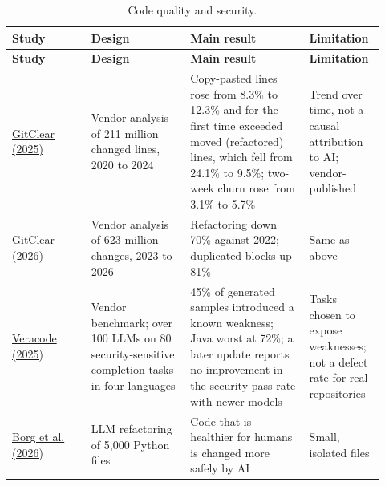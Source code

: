 \documentclass[11pt]{article}
\begin{document}
\small
\begin{longtable}{p{0.2\linewidth}p{0.25\linewidth}p{0.3\linewidth}p{0.17\linewidth}}
\caption{Code quality and security.}\\
\toprule
\textbf{Study} & \textbf{Design} & \textbf{Main result} & \textbf{Limitation} \\
\midrule
\endfirsthead
\toprule
\textbf{Study} & \textbf{Design} & \textbf{Main result} & \textbf{Limitation} \\
\midrule
\endhead
\href{https://www.devclass.com/ai-ml/2025/02/20/ai-is-eroding-code-quality-states-new-in-depth-report/1626250}{GitClear (2025)} & Vendor analysis of 211 million changed lines, 2020 to 2024 & Copy-pasted lines rose from 8.3\% to 12.3\% and for the first time exceeded moved (refactored) lines, which fell from 24.1\% to 9.5\%; two-week churn rose from 3.1\% to 5.7\% & Trend over time, not a causal attribution to AI; vendor-published \\
\href{https://www.gitclear.com/recent_ai_developer_productivity_code_quality_research}{GitClear (2026)} & Vendor analysis of 623 million changes, 2023 to 2026 & Refactoring down 70\% against 2022; duplicated blocks up 81\% & Same as above \\
\href{https://www.businesswire.com/news/home/20250730694951/en/AI-Generated-Code-Poses-Major-Security-Risks-in-Nearly-Half-of-All-Development-Tasks-Veracode-Research-Reveals}{Veracode (2025)} & Vendor benchmark; over 100 LLMs on 80 security-sensitive completion tasks in four languages & 45\% of generated samples introduced a known weakness; Java worst at 72\%; a later update reports no improvement in the security pass rate with newer models & Tasks chosen to expose weaknesses; not a defect rate for real repositories \\
\href{https://arxiv.org/abs/2601.02200v1}{Borg et al. (2026)} & LLM refactoring of 5,000 Python files & Code that is healthier for humans is changed more safely by AI & Small, isolated files \\
\bottomrule
\end{longtable}
\normalsize
\end{document}
